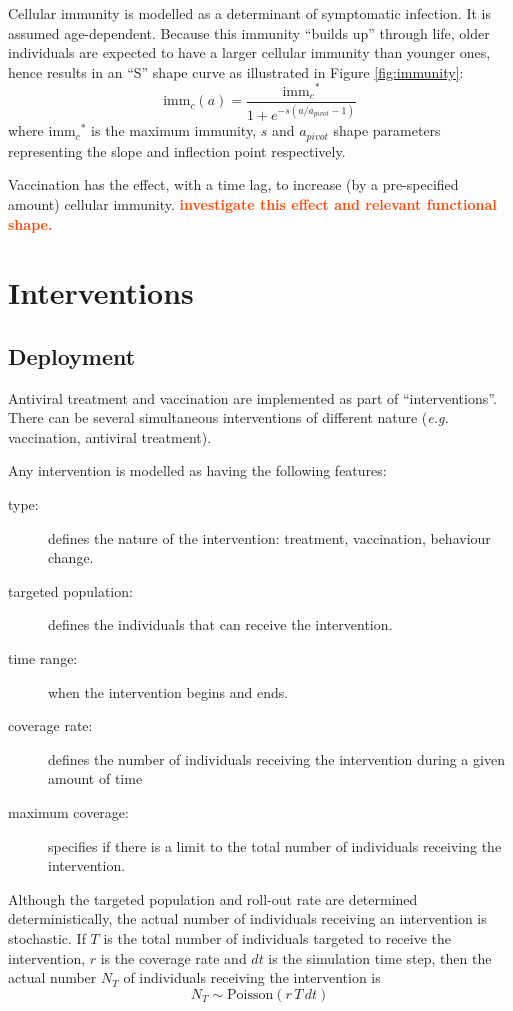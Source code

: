 \documentclass[11pt, onecolumn]{article}
\newcommand{\warning}[1]{\textbf{\textcolor{OrangeRed}{#1}}}
\newcommand{\eg}{\textit{e.g.}\xspace}
\newcommand{\immc}{\ensuremath{\text{imm}_c}}
\begin{document}
Cellular immunity is modelled as a determinant of symptomatic infection. It is assumed age-dependent. Because this immunity ``builds up'' through life, older individuals are expected to have a larger cellular immunity than younger ones, hence results in an ``S'' shape curve as illustrated in Figure \ref{fig:immunity}:
\begin{equation}
\immc(a) = \frac{\immc^*}{1+e^{-s(a/a_{pivot} -1)}}
\end{equation}
where $\immc^*$ is the maximum immunity, $s$ and $a_{pivot}$ shape parameters representing the slope and inflection point respectively.

Vaccination has the effect, with a time lag, to increase (by a pre-specified amount) cellular immunity. \warning{investigate this effect and relevant functional shape.}

\section{Interventions}

\subsection{Deployment}

Antiviral treatment and vaccination are implemented as part of ``interventions''. There can be several simultaneous interventions of different nature (\eg vaccination, antiviral treatment).

Any intervention is modelled as having the following features:
\begin{description}
\item[type: ] defines the nature of the intervention: treatment, vaccination, behaviour change.
\item[targeted population:] defines the individuals that can receive the intervention.
\item[time range:] when the intervention begins and ends.
\item[coverage rate:] defines the number of individuals receiving the intervention during a given amount of time
\item[maximum coverage:] specifies if there is a limit to the total number of individuals receiving the intervention.
\end{description}
 
Although the targeted population and roll-out rate are determined deterministically, the actual number of individuals receiving an intervention is stochastic. If $T$ is the total number of individuals targeted to receive the intervention, $r$ is the coverage rate and $dt$ is the simulation time step, then the actual number $N_T$ of individuals receiving the intervention is
\begin{equation}
N_T \sim \text{Poisson}(r\,T\,dt)
\end{equation}
\end{document}
